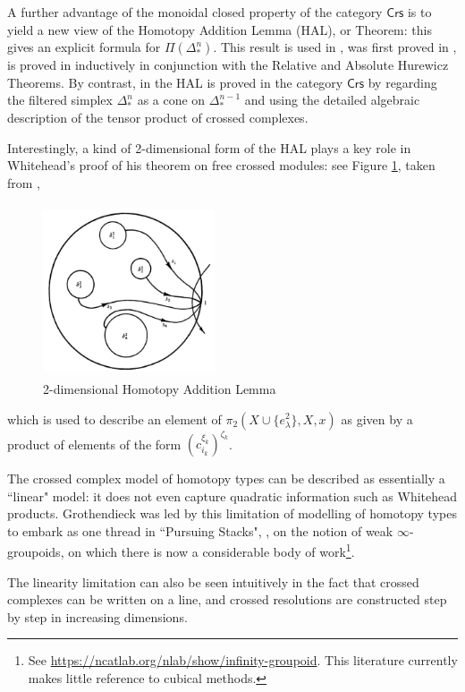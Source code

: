 \documentclass{elsarticle}
\def\Crs{\mathsf{Crs}}
\def\Crs{\mathsf{Crs}}
\def\Crs{\mathsf{Crs}}
\begin{document}
A further advantage of the monoidal closed property of the category $\Crs$ is to yield  a  new view of the Homotopy Addition Lemma (HAL),  or Theorem: this gives an explicit formula for $\Pi(\Delta^n_*)$.  This result is used in \cite{Bl48}, was first proved in \cite{Hu53},  is proved in \cite{WG78} inductively  in conjunction with the Relative and Absolute Hurewicz Theorems. By contrast, in \cite[Theorem 9.9.4]{BHS} the HAL  is proved  in the category $\Crs$ by regarding the filtered simplex  $\Delta^n_*$ as a cone on $\Delta^{n-1}_*$ and using the detailed algebraic description of the tensor product of crossed complexes.

Interestingly, a kind of 2-dimensional form of the HAL plays a key role in Whitehead's proof of his theorem on free crossed modules: see Figure \ref{fig:2dHAL}, taken from  \cite[p.148]{B80},
\begin{figure}[h]\centering
 \includegraphics[width=2in,height=2in]{2dHAL.jpg}

\caption{2-dimensional Homotopy Addition Lemma } \label{fig:2dHAL}
\end{figure}
which is used to describe an element of $\pi_2(X \cup \{ e^2_\lambda \},X,x)$ as given by a product of elements of the form $(c_{i_k}^{\xi_k})^{\zeta_k}$.

The crossed complex model of homotopy types  can be described as essentially a ``linear" model:  it does not even
capture quadratic information such as Whitehead products. Grothendieck was led by this limitation of modelling of homotopy types
to embark as one thread in ``Pursuing Stacks", \cite{GrPS},  on the notion of weak $\infty$-groupoids, on which
there is now a considerable body of  work\footnote{ See \url{https://ncatlab.org/nlab/show/infinity-groupoid}. This literature currently makes little reference to  cubical methods. }.

The linearity limitation can also be seen intuitively in the fact that crossed complexes can be  written on a line, and crossed resolutions are constructed step by step in increasing dimensions.
\end{document}
